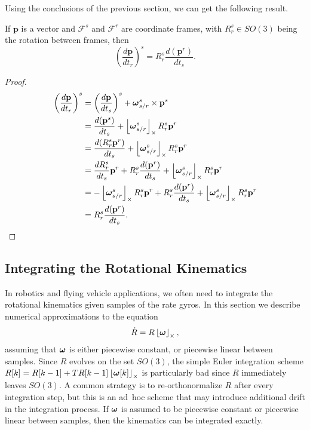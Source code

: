 Using the conclusions of the previous section, we can get the following result.
\begin{lemma}
If $\mathbf{p}$ is a vector and $\mathcal{F}^s$ and $\mathcal{F}^r$ are coordinate frames, with $R_r^s\in SO(3)$ being the rotation between frames, then
\[
\left(\frac{d\mathbf{p}}{dt_r}\right)^s = R_r^s\frac{d (\mathbf{p}^r)}{dt_s}.
\]	
\end{lemma}
\begin{proof}
	\begin{align*}
			\left(\frac{d\mathbf{p}}{dt_r}\right)^s 
				&= \left(\frac{d\mathbf{p}}{dt_s}\right)^s + \boldsymbol{\omega}_{s/r}^s \times \mathbf{p}^s \\
				&= \frac{d(\mathbf{p}^s)}{dt_s} + \left\lfloor\boldsymbol{\omega}_{s/r}^s\right\rfloor_{\times} R_r^s \mathbf{p}^r \\
				&= \frac{d(R_r^s\mathbf{p}^r)}{dt_s} + \left\lfloor\boldsymbol{\omega}_{s/r}^s\right\rfloor_{\times} R_r^s \mathbf{p}^r \\
				&= \frac{dR_r^s}{dt_s}\mathbf{p}^r + R_r^s \frac{d(\mathbf{p}^r)}{dt_s} +\left\lfloor\boldsymbol{\omega}_{s/r}^s\right\rfloor_{\times} R_r^s \mathbf{p}^r \\
				&= -\left\lfloor\boldsymbol{\omega}_{s/r}^s\right\rfloor_{\times} R_r^s\mathbf{p}^r + R_r^s \frac{d(\mathbf{p}^r)}{dt_s} +\left\lfloor\boldsymbol{\omega}_{s/r}^s\right\rfloor_{\times} R_r^s \mathbf{p}^r \\
				&= R_r^s \frac{d(\mathbf{p}^r)}{dt_s}.
	\end{align*}
\end{proof}




\subsection{Integrating the Rotational Kinematics}
In robotics and flying vehicle applications, we often need to integrate the rotational kinematics given samples of the rate gyros. 
In this section we describe numerical approximations to the equation
\begin{equation}\label{eq:Rdot-integrating-1}
\dot{R}=R\ss{\omegabf},
\end{equation}
assuming that $\boldsymbol{\omega}$ is either piecewise constant, or piecewise linear between samples.  Since $R$ evolves on the set $SO(3)$, the simple Euler integration scheme $R[k]=R[k-1]+TR[k-1]\left\lfloor\boldsymbol{\omega}[k]\right\rfloor_{\times}$ is particularly bad since $R$ immediately leaves $SO(3)$.  A common strategy is to re-orthonormalize $R$ after every integration step, but this is an ad~hoc scheme that may introduce additional drift in the integration process.  If $\boldsymbol{\omega}$ is assumed to be piecewise constant or piecewise linear between samples, then the kinematics can be integrated exactly.  

